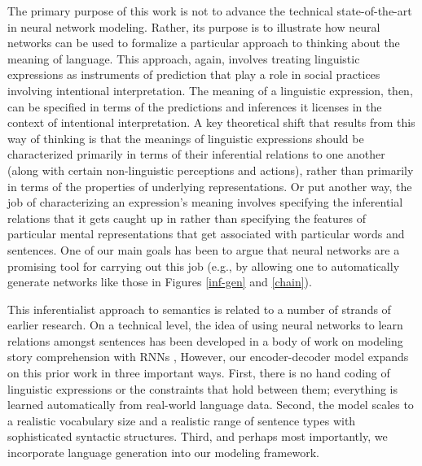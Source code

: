 \documentclass[utf8]{frontiersSCNS} %
\begin{document}
The primary purpose of this work is not to advance the technical state-of-the-art in neural network modeling. Rather, its purpose is to illustrate how neural networks can be used to formalize a particular approach to thinking about the meaning of language. This approach, again, involves treating linguistic expressions as instruments of prediction that play a role in social practices involving intentional interpretation. The meaning of a linguistic expression, then, can be specified in terms of the predictions and inferences it licenses in the context of intentional interpretation. A key theoretical shift that results from this way of thinking is that the meanings of linguistic expressions should be characterized primarily in terms of their inferential relations to one another (along with certain non-linguistic perceptions and actions), rather than primarily in terms of the properties of underlying representations. Or put another way, the job of characterizing an expression's meaning involves specifying the inferential relations that it gets caught up in rather than specifying the features of particular mental representations that get associated with particular words and sentences. One of our main goals has been to argue that neural networks are a promising tool for carrying out this job (e.g., by allowing one to automatically generate networks like those in Figures \ref{inf-gen} and \ref{chain}). 

This inferentialist approach to semantics is related to a number of strands of earlier research. On a technical level, the idea of using neural networks to learn relations amongst sentences has been developed in a body of work on modeling story comprehension with RNNs \citep{Frank:2003,Frank:2009,Golden:1993}, However, our encoder-decoder model expands on this prior work in three important ways. First, there is no hand coding of linguistic expressions or the constraints that hold between them; everything is learned automatically from real-world language data. Second, the model scales to a realistic vocabulary size and a realistic range of sentence types with sophisticated syntactic structures. Third, and perhaps most importantly, we incorporate language generation into our modeling framework.
\end{document}
